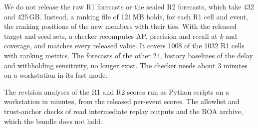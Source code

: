 We do not release the raw R1 forecasts or the sealed R2 forecasts, which take 432 and 425\,GB.
Instead, a ranking file of 121\,MB holds, for each R1 cell and event, the ranking positions of the new members with their ties.
With the released target and seed sets, a checker recomputes AP, precision and recall at $k$ and coverage, and matches every released value.
It covers \num{1008} of the \num{1032} R1 cells with ranking metrics.
The forecasts of the other 24, history baselines of the delay and withholding sensitivity, no longer exist.
The checker needs about 3 minutes on a workstation in its fast mode.

The revision analyses of the R1 and R2 scores run as Python scripts on a workstation in minutes, from the released per-event scores.
The allowlist and trust-anchor checks of  read intermediate replay outputs and the ROA archive, which the bundle does not hold.

